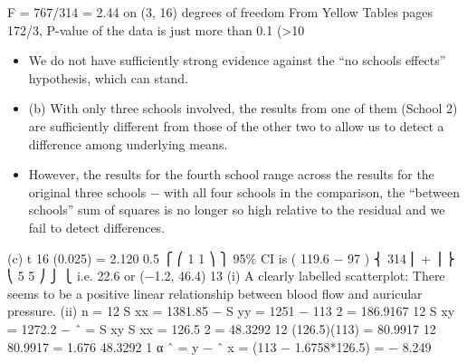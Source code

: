 \documentclass[a4paper,12pt]{article}
\begin{document}
F = 767/314 = 2.44 on (3, 16) degrees of freedom
From Yellow Tables pages 172/3, P-value of the data is just more than
0.1 (>10%
\begin{itemize}
    \item We do not have sufficiently strong evidence against the “no schools
effects” hypothesis, which can stand.
\item (b) With only three schools involved, the results from one of them (School
2) are sufficiently different from those of the other two to allow us to
detect a difference among underlying means.
\item However, the results for
the fourth school range across the results for the original three schools
− with all four schools in the comparison, the “between schools” sum
of squares is no longer so high relative to the residual and we fail to
detect differences.
\end{itemize}

(c) t 16 (0.025) = 2.120
0.5
⎧
⎛ 1 1 ⎞ ⎫
95\% CI is ( 119.6 − 97 )  ⎨ 314 ⎜ + ⎟ ⎬
⎝ 5 5 ⎠ ⎭
⎩
i.e. 22.6  or (−1.2, 46.4)
13
(i)
A clearly labelled scatterplot:
There seems to be a positive linear relationship between blood flow and
auricular pressure.
(ii)
n = 12
S xx = 1381.85 −
S yy = 1251 −
113 2
= 186.9167
12
S xy = 1272.2 −
\beta ˆ =
S xy
S xx
=
126.5 2
= 48.3292
12
(126.5)(113)
= 80.9917
12
80.9917
= 1.676
48.3292
1
α ˆ = y − \beta ˆ x = (113 − 1.6758*126.5) = − 8.249
\end{document}
